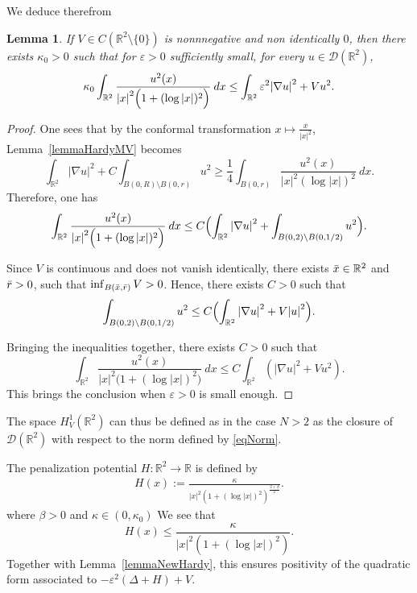 \documentclass[a4paper]{amsart}
\newtheorem{lemma}[proposition]{Lemma}
\begin{document}
We deduce therefrom
\begin{lemma}
\label{lemmaNewHardy}
If $V \in C({\mathbb{R}}^2\setminus \{0\})$ is nonnnegative and non identically $0$, then there exists $\kappa_0 > 0$ such that for $\varepsilon > 0$ sufficiently small, for every $u \in \mathcal{D}({\mathbb{R}}^2)$, 
\[
 \kappa_0 \int_{{\mathbb{R}}^2} \frac{u^2(x)}{{\left| {x} \right|}^2 \Bigl(1+(\log {\left| {x} \right|})^2\Bigr)}\:dx\leq 
\int_{{\mathbb{R}}^2} \varepsilon^2{\left| {\nabla u} \right|}^2 + V u^2.
\]
\end{lemma}
\begin{proof}
One sees that by the conformal transformation $x \mapsto \frac{x}{{\left| {x} \right|}^2}$, Lemma~\ref{lemmaHardyMV} becomes 
\[
 \int_{{\mathbb{R}}^2} {\left| {\nabla u} \right|}^2 + C \int_{B(0,R)\setminus B(0,r)} u^2 \geq \frac{1}{4}
\int_{B(0, r)} \frac{u^2(x)}{{\left| {x} \right|}^2 \left(\log {\left| {x} \right|}\right)^2}\: dx.
\]
Therefore, one has
\[
 \int_{{\mathbb{R}}^2} \frac{u^2(x)}{{\left| {x} \right|}^2 \Bigl(1+(\log {\left| {x} \right|})^2\Bigr)}\:dx\leq 
C\Bigl(\int_{{\mathbb{R}}^2} {\left| {\nabla u} \right|}^2+\int_{B(0, 2)\setminus B(0, 1/2)} u^2\Bigr).
\]

Since $V$ is continuous and does not vanish identically, there exists $\Bar{x} \in {\mathbb{R}}^2$ and $\Bar{r} > 0$, 
such that $\inf_{B(\Bar{x},\Bar{r})} V > 0$. Hence, there exists $C > 0$ such that 
\[
 \int_{B(0,2)\setminus B(0,1/2)} u^2 \leq C\Bigl(\int_{{\mathbb{R}}^2} {\left| {\nabla u} \right|}^2 + V {\left| {u} \right|}^2\Bigr).
\]

Bringing the inequalities together, there exists $C > 0$ such that 
\[
 \int_{{\mathbb{R}}^2} \frac{u^2(x)}{{\left| {x} \right|}^2 \bigl(1+(\log {\left| {x} \right|})^2\bigr)}\:dx\leq 
C\int_{{\mathbb{R}}^2} ({\left| {\nabla u} \right|}^2+V u^2).
\]
This brings the conclusion when $\varepsilon > 0$ is small enough.
\end{proof}

The space $H^1_V({\mathbb{R}}^2)$ can thus be defined as in the case $N>2$ as the closure of $\mathcal{D}({\mathbb{R}}^2)$ with respect to the
norm defined by \eqref{eqNorm}.

The penalization potential $H : {\mathbb{R}}^2 \to {\mathbb{R}}$ is defined by
\begin{align*}
 H(x) := \frac{\kappa}{{\left| {x} \right|}^2 \left( 1+(\log {\left| {x} \right|})^2 \right)^{\frac{2+\beta}{2}}}.
\end{align*}
where $\beta > 0$ and $\kappa \in (0, \kappa_0)$
We see that
\[
 H(x) \leq \frac{\kappa}{{\left| {x} \right|}^2 \left( 1+(\log {\left| {x} \right|})^2 \right)}.
\]
Together with Lemma~\eqref{lemmaNewHardy}, this ensures positivity of the quadratic form associated to $-\varepsilon^2
(\Delta+H) + V$. 
\end{document}
